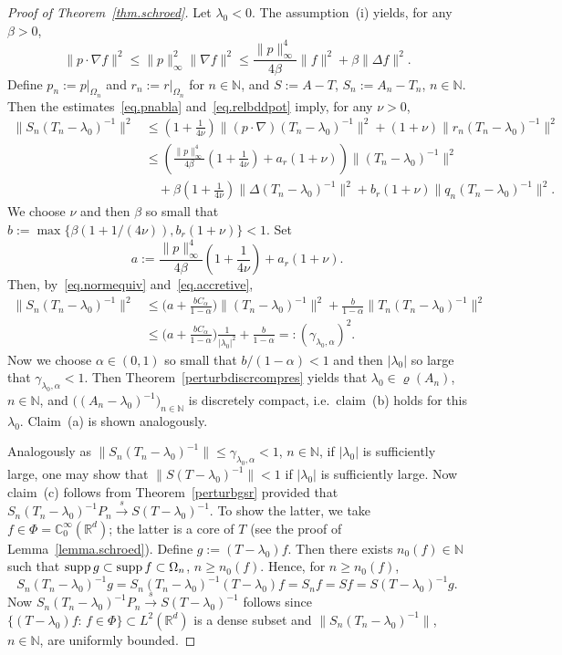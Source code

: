 \documentclass[a4paper,reqno]{amsart}
\begin{document}
\begin{proof}[Proof of Theorem~{\rm\ref{thm.schroed}}]
Let $\lambda_0<0$. The assumption~(i) yields, for any~$\beta>0$,
\begin{equation}\label{eq.pnabla}
\| p\cdot \nabla f\|^2\leq \|p\|_{\infty}^2\|\nabla f\|^2\leq \frac{\|p\|_{\infty}^4}{4\beta}\|f\|^2+\beta \|\Delta f\|^2.
\end{equation}
Define $p_n:=p|_{\Omega_n}$  and $r_n:=r|_{\Omega_n}$ for $n\in{\mathbb{N}}$, and $S:=A-T$, $S_n:=A_n-T_n$, $n\in{\mathbb{N}}$.
 Then the estimates~\eqref{eq.pnabla} and~\eqref{eq.relbddpot} imply, for any $\nu>0$,
\begin{align*}
\|S_n(T_n-\lambda_0)^{-1}\|^2
&\leq \left(1+\frac{1}{4\nu}\right)\|(p\cdot \nabla)(T_n-\lambda_0)^{-1}\|^2+(1+\nu)\|r_n(T_n-\lambda_0)^{-1}\|^2\\
&\leq \left(\frac{\|p\|_{\infty}^4}{4\beta}\left(1+\frac{1}{4\nu}\right)+a_r(1+\nu)\right)\|(T_n-\lambda_0)^{-1}\|^2\\
&\quad+\beta\left(1+\frac{1}{4\nu}\right)\|\Delta(T_n-\lambda_0)^{-1}\|^2+ b_r(1+\nu)\|q_n(T_n-\lambda_0)^{-1}\|^2.
\end{align*}
We choose $\nu$ and then $\beta$ so small that $b:=\max\{\beta(1+1/(4\nu)),b_r(1+\nu)\}<1$.
Set $$a:=\frac{\|p\|_{\infty}^4}{4\beta}\left(1+\frac{1}{4\nu}\right)+a_r(1+\nu).$$
Then, by~\eqref{eq.normequiv} and~\eqref{eq.accretive},
\begin{align*}
\|S_n(T_n-\lambda_0)^{-1}\|^2
&\leq  \bigg(a+\frac{ b C_{\alpha}}{1-\alpha}\bigg)\|(T_n-\lambda_0)^{-1}\|^2+\frac{b}{1-\alpha}\|T_n(T_n-\lambda_0)^{-1}\|^2\\
& \leq  \bigg(a+\frac{ b C_{\alpha}}{1-\alpha}\bigg)\frac{1}{|\lambda_0|^2}+\frac{b}{1-\alpha}=:(\gamma_{\lambda_0,\alpha})^2.
\end{align*}
Now we choose $\alpha\in (0,1)$ so small that $b/(1-\alpha)<1$ and then $|\lambda_0|$ so large that $\gamma_{\lambda_0,\alpha}<1$. Then 
Theorem~\ref{perturbdiscrcompres} yields that  $\lambda_0\in\varrho(A_n)$, $n\in{\mathbb{N}}$, and $\big((A_n-\lambda_0)^{-1}\big)_{n\in{\mathbb{N}}}$ is discretely compact, i.e.\ claim~(b)  holds for this $\lambda_0$. Claim~(a) is shown analogously.

Analogously as $\|S_n(T_n-\lambda_0)^{-1}\|\leq\gamma_{\lambda_0,\alpha}<1$, $n\in{\mathbb{N}}$, if $|\lambda_0|$ is sufficiently large,  one may show that $\|S(T-\lambda_0)^{-1}\|<1$ if $|\lambda_0|$ is sufficiently large. 
Now claim~(c) follows from Theorem~\ref{perturbgsr} provided that $S_n(T_n-\lambda_0)^{-1}P_n{\stackrel{s}{\rightarrow}} S(T-\lambda_0)^{-1}$. 
To show the latter, we take $f\in\Phi={\mathbb{C}}_0^{\infty}({\mathbb{R}}^d)$; the latter is a core of $T$ (see the proof of Lemma~\ref{lemma.schroed}).
Define $g:=(T-\lambda_0)f$. Then there exists $n_0(f)\in{\mathbb{N}}$ such that ${\rm supp}\,g\subset{\rm supp}\,f\subset \Omega_n$, $n\geq n_0(f)$.
Hence, for $n\geq n_0(f)$, $$S_n(T_n-\lambda_0)^{-1}g=S_n(T_n-\lambda_0)^{-1}(T-\lambda_0)f=S_nf=Sf=S(T-\lambda_0)^{-1}g.$$
Now $S_n(T_n-\lambda_0)^{-1}P_n{\stackrel{s}{\rightarrow}} S(T-\lambda_0)^{-1}$ follows since $\{(T-\lambda_0)f:\,f\in\Phi\}\subset L^2({\mathbb{R}}^d)$ is a dense subset and $\|S_n(T_n-\lambda_0)^{-1}\|$, $n\in{\mathbb{N}}$, are uniformly bounded.


\end{proof}
\end{document}
